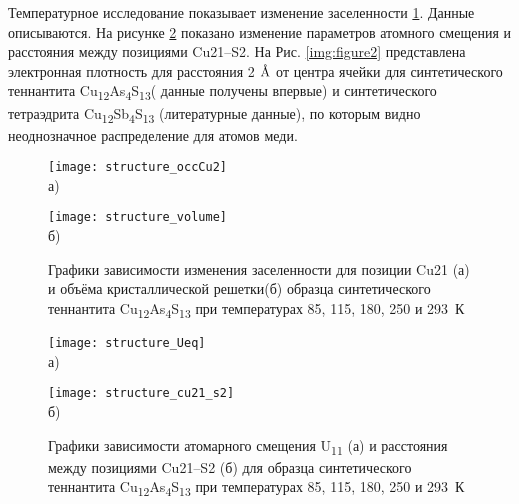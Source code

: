 Температурное исследование показывает изменение  заселенности \ref{img:structure1}. Данные описываются. На рисунке \ref{img:structure2} показано изменение  параметров атомного смещения и расстояния между позициями Cu21--S2.
На Рис. \ref{img:figure2} представлена электронная плотность для расстояния 2 $\mbox{\normalfont\AA}$ от центра ячейки для синтетического теннантита Cu\textsubscript{12}As\textsubscript{4}S\textsubscript{13}( данные получены впервые) и синтетического тетраэдрита Cu\textsubscript{12}Sb\textsubscript{4}S\textsubscript{13} (литературные данные), по которым видно неоднозначное распределение для атомов меди.

\begin{figure}[p!]
  \begin{minipage}[ht]{0.9\linewidth}\centering
    \texttt{[image: structure\_occCu2]} \\ а)
  \end{minipage}
  \vfill
  \begin{minipage}[ht]{0.9\linewidth}\centering
    \texttt{[image: structure\_volume]} \\ б)
  \end{minipage}

      \caption[Графики зависимости изменения заселенности для позиции Cu21(а) и объёма кристаллической решетки (б) образца синтетического теннантита Cu\textsubscript{12}As\textsubscript{4}S\textsubscript{13} при температурах 85, 115, 180, 250 и 293~К]{Графики зависимости изменения заселенности для позиции Cu21 (а) и объёма кристаллической решетки(б) образца синтетического теннантита Cu\textsubscript{12}As\textsubscript{4}S\textsubscript{13} при температурах 85, 115, 180, 250 и 293~К}
    \label{img:structure1}
\end{figure}

\begin{figure}[p!]
  \begin{minipage}[ht]{0.9\linewidth}\centering
    \texttt{[image: structure\_Ueq]} \\ а)
  \end{minipage}
  \vfill
  \begin{minipage}[ht]{0.9\linewidth}\centering
    \texttt{[image: structure\_cu21\_s2]} \\ б)
  \end{minipage}

      \caption[Графики зависимости атомарного смещения U\textsubscript{11} (а) и расстояния между позициями Cu21--S2 (б) для образца синтетического теннантита Cu\textsubscript{12}As\textsubscript{4}S\textsubscript{13} при температурах 85, 115, 180, 250 и 293~К]{Графики зависимости атомарного смещения U\textsubscript{11} (а) и расстояния между позициями Cu21--S2 (б) для образца синтетического теннантита Cu\textsubscript{12}As\textsubscript{4}S\textsubscript{13} при температурах 85, 115, 180, 250 и 293~К}
    \label{img:structure2}
\end{figure}
\newpage

